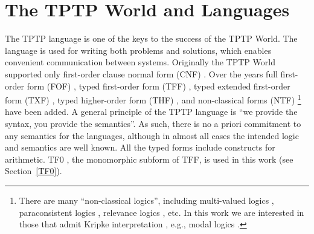\documentclass{easychair}
\begin{document}
\section{The TPTP World and Languages}
\label{TPTP}

The TPTP language \cite{Sut22-IGPL} is one of the keys to the success of the TPTP World.
The language is used for writing both problems and solutions,
which enables convenient communication between systems. 
Originally the TPTP World supported only first-order clause normal form (CNF)
\cite{SS98-JAR}.
Over the years full first-order form (FOF)
\cite{Sut09}, 
typed first-order form (TFF)
\cite{SS+12,BP13-TFF1}, 
typed extended first-order form (TXF)
\cite{SK18}, 
typed higher-order form (THF)
\cite{SB10,KSR16}, 
and non-classical forms (NTF)
\footnote{%
There are many ``non-classical logics'', including multi-valued logics \cite{Aug17},
paraconsistent logics \cite{Pri02}, relevance logics \cite{AB75}, etc.
In this work we are interested in those that admit Kripke interpretation \cite{Kri63},
e.g., modal logics \cite{BBW06}.}
\cite{SF+22} 
have been added.
A general principle of the TPTP language is ``we provide the syntax, you provide the semantics''.
As such, there is no a priori commitment to any semantics for the languages, although in almost 
all cases the intended logic and semantics are well known.
All the typed forms include constructs for arithmetic.
TF0 \cite{SS+12}, the monomorphic subform of TFF, is used in this work (see Section~\ref{TF0}).
\end{document}
